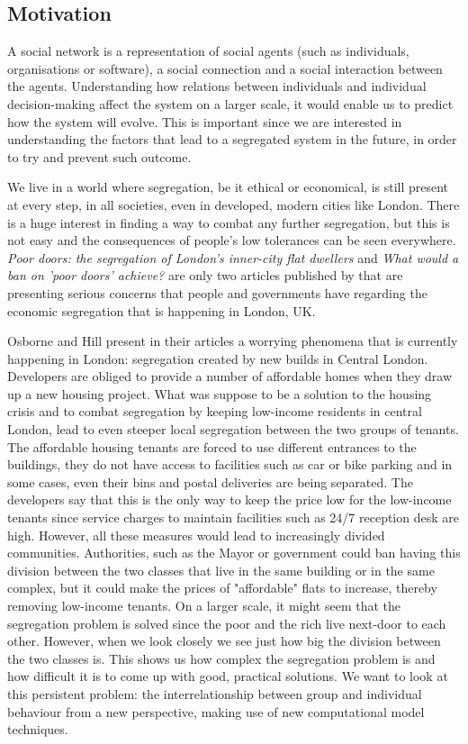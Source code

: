 \documentclass[../main.tex]{subfiles}
\begin{document}
\subsection{Motivation}
A social network is a representation of social agents (such as individuals, organisations or software), a social connection and a social interaction between the agents. Understanding how relations between individuals and individual decision-making affect the system on a larger scale, it would enable us to predict how the system will evolve. This is important since we are interested in understanding the factors that lead to a segregated system in the future, in order to try and prevent such outcome.

We live in a world where segregation, be it ethical or economical, is still present at every step, in all societies, even in developed, modern cities like London. There is a huge interest in finding a way to combat any further segregation, but this is not easy and the consequences of people's low tolerances can be seen everywhere. \textit{Poor doors: the segregation of London's inner-city flat dwellers} \cite[]{article1} and \textit{What would a ban on 'poor doors' achieve?} \cite[]{article2} are only two articles published by \cite[]{guardian} that are presenting serious concerns that people and governments have regarding the economic segregation that is happening in London, UK. 

Osborne and Hill present in their articles a worrying phenomena that is currently happening in London: segregation created by new builds in Central London. Developers are obliged to provide a number of affordable homes when they draw up a new housing project. What was suppose to be a solution to the housing crisis and to combat segregation by keeping low-income residents in central London, lead to even steeper local segregation between the two groups of tenants. The affordable housing tenants are forced to use different entrances to the buildings, they do not have access to facilities such as car or bike parking and in some cases, even their bins and postal deliveries are being separated. The developers say that this is the only way to keep the price low for the low-income tenants since service charges to maintain facilities such as 24/7 reception desk are high. However, all these measures would lead to increasingly divided communities. Authorities, such as the Mayor or government could ban having this division between the two classes that live in the same building or in the same complex, but it could make the prices of "affordable" flats to increase, thereby removing low-income tenants. On a larger scale, it might seem that the segregation problem is solved since the poor and the rich live next-door to each other. However, when we look closely we see just how big the division between the two classes is. This shows us how complex the segregation problem is and how difficult it is to come up with good, practical solutions. We want to look at this persistent problem: the interrelationship between group and individual behaviour from a new perspective, making use of new computational model techniques.
\end{document}

